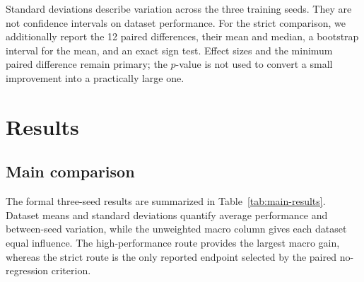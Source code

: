 \documentclass[preprint,12pt,times]{elsarticle}
\newcommand{\tabref}[1]{\textcolor{floatreviewblue}{Table~\ref{#1}}}
\newcommand{\tabref}[1]{Table~\ref{#1}}
\begin{document}
Standard deviations describe variation across the three training seeds. They
are not confidence intervals on dataset performance. For the strict
comparison, we additionally report the 12 paired differences, their mean and
median, a bootstrap interval for the mean, and an exact sign test. Effect
sizes and the minimum paired difference remain primary; the $p$-value is not
used to convert a small improvement into a practically large one.

\section{Results}
\label{sec:results}

\subsection{Main comparison}

The formal three-seed results are summarized in
\tabref{tab:main-results}. Dataset means and standard deviations quantify
average performance and between-seed variation, while the unweighted macro
column gives each dataset equal influence. The high-performance route provides
the largest macro gain, whereas the strict route is the only reported endpoint
selected by the paired no-regression criterion.
\end{document}

